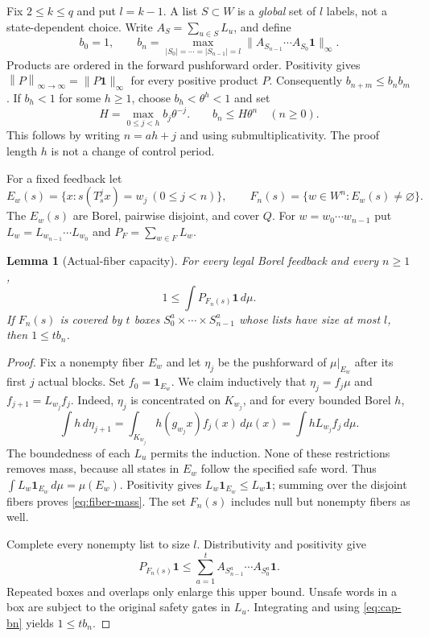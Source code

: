 \documentclass[11pt,reqno]{amsart}
\numberwithin{equation}{section}
\newtheorem{lemma}[theorem]{Lemma}
\theoremstyle{definition}
\newcommand{\one}{\mathbf 1}
\newcommand{\opnorm}[1]{\left\|#1\right\|_{\infty\to\infty}}
\begin{document}
Fix $2\le k\le q$ and put $l=k-1$. A list $S\subset W$ is a
\emph{global} set of $l$ labels, not a state-dependent choice.
Write $A_S=\sum_{u\in S}L_u$, and define
\begin{equation}\label{eq:cap-bn}
 b_0=1,\qquad
 b_n=\max_{|S_0|=\cdots=|S_{n-1}|=l}
 \|A_{S_{n-1}}\cdots A_{S_0}\one\|_\infty.
\end{equation}
Products are ordered in the forward pushforward order. Positivity gives
$\opnorm{P}=\|P\one\|_\infty$ for every positive product $P$.
Consequently $b_{n+m}\le b_nb_m$. If $b_h<1$ for some $h\ge1$,
choose $b_h<\theta^h<1$ and set
\begin{equation}\label{eq:cap-exp}
 H=\max_{0\le j<h}b_j\theta^{-j}.
 \qquad b_n\le H\theta^n\quad(n\ge0).
\end{equation}
This follows by writing $n=ah+j$ and using submultiplicativity.
The proof length $h$ is not a change of control period.

For a fixed feedback let
\[
 E_w(s)=\{x:s(T_s^jx)=w_j\ (0\le j<n)\},\qquad
 F_n(s)=\{w\in W^n:E_w(s)\ne\varnothing\}.
\]
The $E_w(s)$ are Borel, pairwise disjoint, and cover $Q$.
For $w=w_0\cdots w_{n-1}$ put
$L_w=L_{w_{n-1}}\cdots L_{w_0}$ and
$P_F=\sum_{w\in F}L_w$.

\begin{lemma}[Actual-fiber capacity]\label{lem:fiber-cap}
For every legal Borel feedback and every $n\ge1$,
\begin{equation}\label{eq:fiber-mass}
 1\le\int P_{F_n(s)}\one\,d\mu.
\end{equation}
If $F_n(s)$ is covered by $t$ boxes
$S^a_0\times\cdots\times S^a_{n-1}$ whose lists have size at
most $l$, then $1\le t b_n$.
\end{lemma}
\begin{proof}
Fix a nonempty fiber $E_w$ and let $\eta_j$ be the pushforward
of $\mu|_{E_w}$ after its first $j$ actual blocks. Set
$f_0=\one_{E_w}$. We claim inductively that
$\eta_j=f_j\mu$ and $f_{j+1}=L_{w_j}f_j$. Indeed,
$\eta_j$ is concentrated on $K_{w_j}$, and for every bounded Borel $h$,
\[
 \int h\,d\eta_{j+1}
 =\int_{K_{w_j}}h(g_{w_j}x)f_j(x)\,d\mu(x)
 =\int hL_{w_j}f_j\,d\mu.
\]
The boundedness of each $L_u$ permits the induction. None of these
restrictions removes mass, because all states in $E_w$ follow the
specified safe word. Thus $\int L_w\one_{E_w}\,d\mu=\mu(E_w)$.
Positivity gives $L_w\one_{E_w}\le L_w\one$; summing over the
disjoint fibers proves \eqref{eq:fiber-mass}. The set $F_n(s)$ includes
null but nonempty fibers as well.

Complete every nonempty list to size $l$. Distributivity and positivity
give
\[
 P_{F_n(s)}\one\le\sum_{a=1}^t
 A_{S^a_{n-1}}\cdots A_{S^a_0}\one.
\]
Repeated boxes and overlaps only enlarge this upper bound. Unsafe
words in a box are subject to the original safety gates in $L_u$.
Integrating and using \eqref{eq:cap-bn} yields $1\le tb_n$.
\end{proof}
\end{document}
